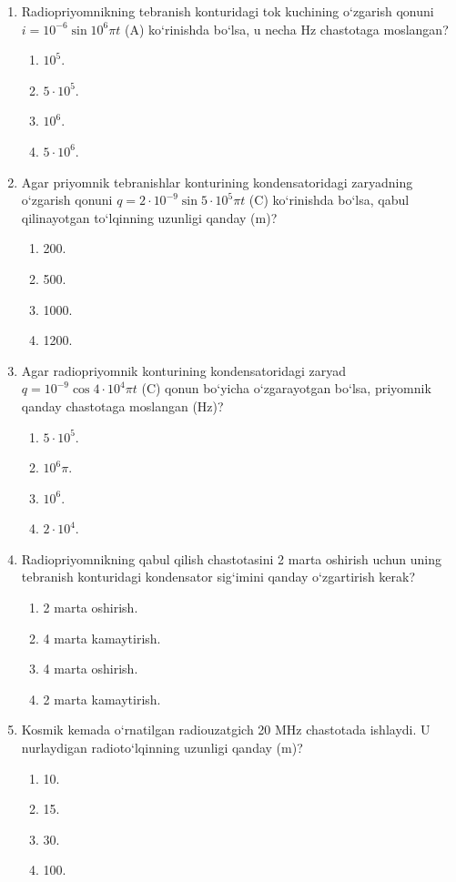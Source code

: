 \begin{enumerate}

\item Radiopriyomnikning tebranish konturidagi tok kuchining o‘zgarish qonuni $i = 10^{-6}\sin10^6\pi t$ (A) ko‘rinishda bo‘lsa, u necha Hz chastotaga moslangan?
\begin{enumerate}[label=\Alph*)]
\item $10^5$.
\item $5\cdot 10^5$.
\item $10^6$.
\item $5\cdot 10^6$.
\end{enumerate}

\item Agar priyomnik tebranishlar konturining kondensatoridagi zaryadning o‘zgarish qonuni $q = 2 \cdot 10^{-9}\sin5 \cdot 10^5\pi t$ (C) ko‘rinishda bo‘lsa, qabul qilinayotgan to‘lqinning uzunligi qanday (m)?
\begin{enumerate}[label=\Alph*)]
\item 200.
\item 500.
\item 1000.
\item 1200.
\end{enumerate}

\item Agar radiopriyomnik konturining kondensatoridagi zaryad $q = 10^{-9}\cos4 \cdot 10^4\pi t$ (C) qonun bo‘yicha o‘zgarayotgan bo‘lsa, priyomnik qanday chastotaga moslangan (Hz)?
\begin{enumerate}[label=\Alph*)]
\item $5\cdot 10^5$.
\item $10^6\pi$.
\item $10^6$.
\item $2\cdot 10^4$.
\end{enumerate}

\item Radiopriyomnikning qabul qilish chastotasini 2 marta oshirish uchun uning tebranish konturidagi kondensator sig‘imini qanday o‘zgartirish kerak?
\begin{enumerate}[label=\Alph*)]
\item 2 marta oshirish.
\item 4 marta kamaytirish.
\item 4 marta oshirish.
\item 2 marta kamaytirish.
\end{enumerate}

\item Kosmik kemada o‘rnatilgan radiouzatgich 20 MHz chastotada ishlaydi. U nurlaydigan radioto‘lqinning uzunligi qanday (m)?
\begin{enumerate}[label=\Alph*)]
\item 10.
\item 15.
\item 30.
\item 100.
\end{enumerate}


\end{enumerate}

